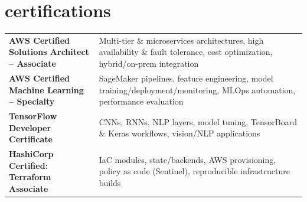 \section{certifications}\label{sec:certifications}%
{\small
\begin{tabularx}{\linewidth}{@{}>{\bfseries}l@{\hspace{0.5em}}X@{}}
AWS Certified Solutions Architect – Associate & Multi-tier \& microservices architectures, high availability \& fault tolerance, cost optimization, hybrid/on-prem integration \\[3pt]
AWS Certified Machine Learning – Specialty & SageMaker pipelines, feature engineering, model training/deployment/monitoring, MLOps automation, performance evaluation \\[3pt]
TensorFlow Developer Certificate & CNNs, RNNs, NLP layers, model tuning, TensorBoard \& Keras workflows, vision/NLP applications \\[3pt]
HashiCorp Certified: Terraform Associate & IaC modules, state/backends, AWS provisioning, policy as code (Sentinel), reproducible infrastructure builds \\
\end{tabularx}
}
